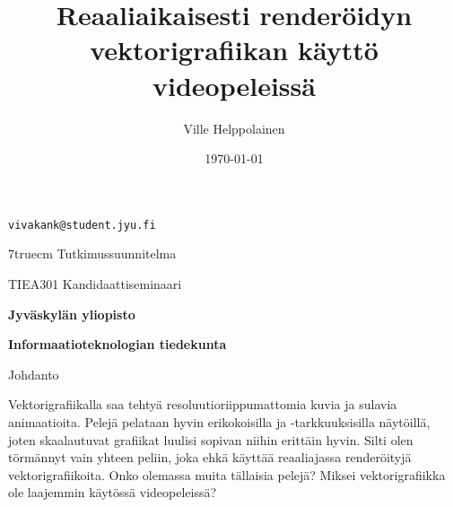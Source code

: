 \documentclass[a4paper,12pt,final,twoside]{report}
\makeatletter
\renewcommand\chapter{\@startsection{chapter}{1}{\z@}
		{-28pt}
		{28pt}
		{\fontsize{14pt}{14pt}\selectfont}
	}
\makeatother
\begin{document}

\title{Reaaliaikaisesti renderöidyn vektorigrafiikan käyttö videopeleissä}
\date{\today}
\author{Ville Helppolainen}
\def\contactinformation{\texttt{vivakank@student.jyu.fi}}
\def\university{Jyväskylän yliopisto}
\def\department{Informaatioteknologian tiedekunta}
\def\subject{Tutkimussuunnitelma}
\def\type{TIEA301 Kandidaattiseminaari}


\makeatletter
	\begin{titlepage}
		\thispagestyle{empty}

		\vspace*{6truecm} 									%

		\centerline{\bf \@author}							%
		\centerline{\contactinformation}					%

		\vspace{2truecm}									%
		
		{\Large\bf \parbox{\textwidth}{\centering \@title}}	%

		\vspace{4truecm}									%
		
		{\parindent7truecm\parskip0pt
			\subject \par									%
			\type \par										%
			\@date \par										%
		}

		\vfill
		\centerline{\large\bf \university}					%
		\centerline{\bf \department}						%
	\end{titlepage}
\makeatother

\pagebreak


\setcounter{page}{1}


\chapter{Johdanto}

Vektorigrafiikalla saa tehtyä resoluutioriippumattomia kuvia ja sulavia animaatioita. Pelejä pelataan hyvin erikokoisilla ja -tarkkuuksisilla näytöillä, joten skaalautuvat grafiikat luulisi sopivan niihin erittäin hyvin. Silti olen törmännyt vain yhteen peliin, joka ehkä käyttää reaaliajassa renderöityjä vektorigrafiikoita. Onko olemassa muita tällaisia pelejä? Miksei vektorigrafiikka ole laajemmin käytössä videopeleissä?
\end{document}
